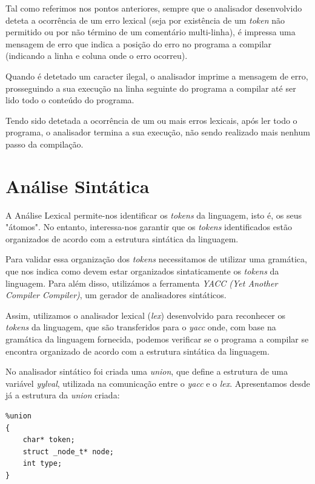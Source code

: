 \documentclass[11pt,a4paper]{article}
\begin{document}
	Tal como referimos nos pontos anteriores, sempre que o analisador desenvolvido deteta a ocorrência de um erro lexical (seja por existência de um \emph{token} não permitido ou por não término de um comentário multi-linha), é impressa uma mensagem de erro que indica a posição do erro no programa a compilar (indicando a linha e coluna onde o erro ocorreu).
	
	Quando é detetado um caracter ilegal, o analisador imprime a mensagem de erro, prosseguindo a sua execução na linha seguinte do programa a compilar até ser lido todo o conteúdo do programa.
	
	Tendo sido detetada a ocorrência de um ou mais erros lexicais, após ler todo o programa, o analisador termina a sua execução, não sendo realizado mais nenhum passo da compilação.


\pagebreak

\section{Análise Sintática}

A Análise Lexical permite-nos identificar os \emph{tokens} da linguagem, isto é, os seus "átomos". No entanto, interessa-nos garantir que os \emph{tokens} identificados estão organizados de acordo com a estrutura sintática da linguagem.

Para validar essa organização dos \emph{tokens} necessitamos de utilizar uma gramática, que nos indica como devem estar organizados sintaticamente os \emph{tokens} da linguagem. Para além disso, utilizámos a ferramenta \emph{YACC (Yet Another Compiler Compiler)}, um gerador de analisadores sintáticos.

Assim, utilizamos o analisador lexical (\emph{lex}) desenvolvido para reconhecer os \emph{tokens} da linguagem, que são transferidos para o \emph{yacc} onde, com base na gramática da linguagem fornecida, podemos verificar se o programa a compilar se encontra organizado de acordo com a estrutura sintática da linguagem.

No analisador sintático foi criada uma \emph{union}, que define a estrutura de uma variável \emph{yylval}, utilizada na comunicação entre o \emph{yacc} e o \emph{lex}. Apresentamos desde já a estrutura da \emph{union} criada:

\begin{lstlisting}
%union
{
    char* token;    
    struct _node_t* node;
    int type;
}
\end{lstlisting}
\end{document}
